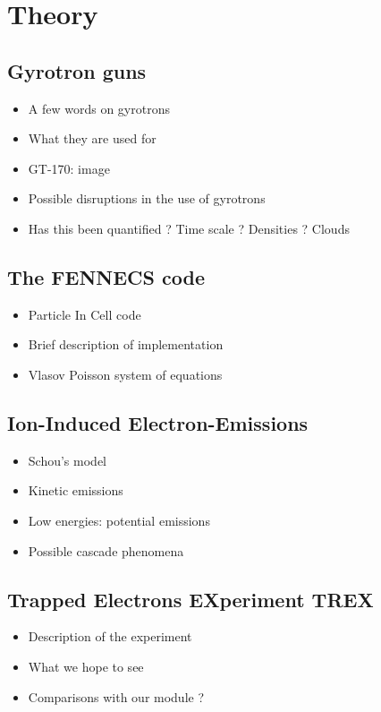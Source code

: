\section{Theory}\label{Theory}

\subsection{Gyrotron guns}
\begin{itemize}
\item{A few words on gyrotrons}
\item{What they are used for}
\item{GT-170: image}
\item{Possible disruptions in the use of gyrotrons}
\item{Has this been quantified ? Time scale ? Densities ? Clouds}
\end{itemize}

\subsection{The FENNECS code}
\begin{itemize}
\item{Particle In Cell code}
\item{Brief description of implementation}
\item{Vlasov Poisson system of equations}
\end{itemize}

\subsection{Ion-Induced Electron-Emissions}
\begin{itemize}
\item{Schou's model}
\item{Kinetic emissions}
\item{Low energies: potential emissions}
\item{Possible cascade phenomena}
\end{itemize}

\subsection{Trapped Electrons EXperiment TREX}
\begin{itemize}
\item{Description of the experiment}
\item{What we hope to see}
\item{Comparisons with our module ?}
\end{itemize}


